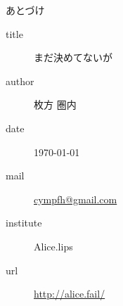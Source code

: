 \documentclass[a4paper,cjk]{book}
\begin{document}
\vspace*{0.7\textheight}
\begin{shadebox}
  \begin{center}
    あとづけ
  \end{center}
  \begin{description}
    \item[title] まだ決めてないが
    \item[author] 枚方 圏内
    \item[date] \today
    \item[mail] \url{cympfh@gmail.com}
    \item[institute] Alice.lips
    \item[url] \url{http://alice.fail/}
  \end{description}
\end{shadebox}

\newpage
\Huge
\vspace*{0.4\textheight}
\end{document}

